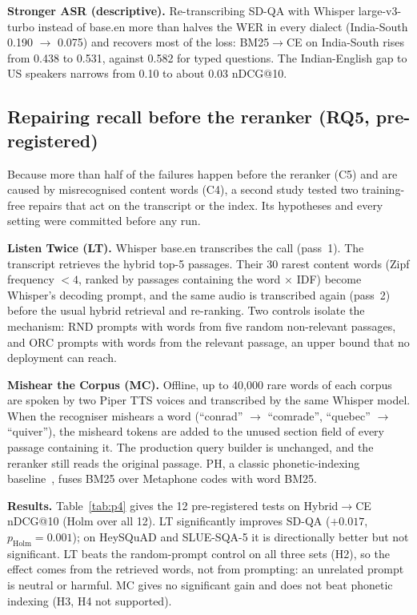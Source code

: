 \documentclass[conference]{IEEEtran}
\newcommand{\ra}{$\rightarrow$}
\begin{document}
\textbf{Stronger ASR (descriptive).} Re-transcribing SD-QA with Whisper large-v3-turbo instead of base.en more than halves the WER in every dialect (India-South 0.190 \ra{} 0.075) and recovers most of the loss: BM25\ra CE on India-South rises from 0.438 to 0.531, against 0.582 for typed questions. The Indian-English gap to US speakers narrows from 0.10 to about 0.03 nDCG@10.

\subsection{Repairing recall before the reranker (RQ5, pre-registered)}
Because more than half of the failures happen before the reranker (C5) and are caused by misrecognised content words (C4), a second study tested two training-free repairs that act on the transcript or the index. Its hypotheses and every setting were committed before any run.

\textbf{Listen Twice (LT).} Whisper base.en transcribes the call (pass~1). The transcript retrieves the hybrid top-5 passages. Their 30 rarest content words (Zipf frequency $<4$, ranked by passages containing the word $\times$ IDF) become Whisper's decoding prompt, and the same audio is transcribed again (pass~2) before the usual hybrid retrieval and re-ranking. Two controls isolate the mechanism: RND prompts with words from five random non-relevant passages, and ORC prompts with words from the relevant passage, an upper bound that no deployment can reach.

\textbf{Mishear the Corpus (MC).} Offline, up to 40,000 rare words of each corpus are spoken by two Piper TTS voices and transcribed by the same Whisper model. When the recogniser mishears a word (``conrad'' \ra{} ``comrade'', ``quebec'' \ra{} ``quiver''), the misheard tokens are added to the unused section field of every passage containing it. The production query builder is unchanged, and the reranker still reads the original passage. PH, a classic phonetic-indexing baseline~\cite{ng98}, fuses BM25 over Metaphone codes with word BM25.

\textbf{Results.} Table~\ref{tab:p4} gives the 12 pre-registered tests on Hybrid\ra CE nDCG@10 (Holm over all 12). LT significantly improves SD-QA ($+0.017$, $p_\text{Holm}=0.001$); on HeySQuAD and SLUE-SQA-5 it is directionally better but not significant. LT beats the random-prompt control on all three sets (H2), so the effect comes from the retrieved words, not from prompting: an unrelated prompt is neutral or harmful. MC gives no significant gain and does not beat phonetic indexing (H3, H4 not supported).
\end{document}
